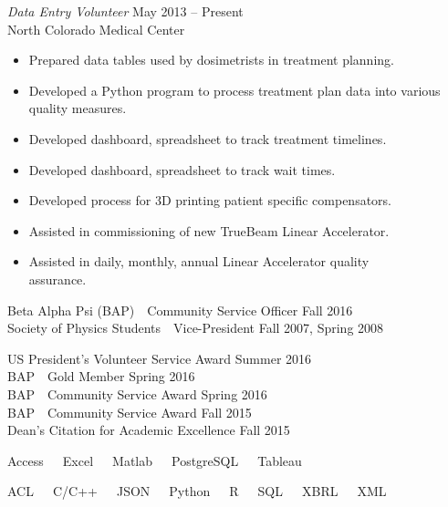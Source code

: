 \documentclass{article}
\begin{document}
\begin{description}[leftmargin=!,labelwidth=3cm]
{\sl Data Entry Volunteer} \hfill May 2013 -- Present\\North Colorado Medical Center
\begin{itemize}[rightmargin=4.3cm]
    \item Prepared data tables used by dosimetrists in treatment planning.
    \item Developed a Python program to process treatment plan data into various quality measures.
    \item Developed dashboard, spreadsheet to track treatment timelines.
    \item Developed dashboard, spreadsheet to track wait times.
    \item Developed process for 3D printing patient specific compensators.
    \item Assisted in commissioning of new TrueBeam Linear Accelerator.
    \item Assisted in daily, monthly, annual Linear Accelerator quality \\ assurance.
\end{itemize}

\item[Leadership]
Beta Alpha Psi (BAP)\ \ Community Service Officer \hfill Fall 2016\\
Society of Physics Students\ \ Vice-President \hfill Fall 2007, Spring 2008

\item[Awards]
US President's Volunteer Service Award \hfill Summer 2016\\
BAP\ \ Gold Member \hfill Spring 2016\\
BAP\ \ Community Service Award \hfill Spring 2016\\
BAP\ \ Community Service Award \hfill   Fall 2015\\
Dean's Citation for Academic Excellence \hfill Fall 2015

\item[Tools]
Access\ \ \ Excel\ \ \ Matlab\ \ \ PostgreSQL\ \ \ Tableau

\item[Languages]
ACL\ \ \ C/C++\ \ \ JSON\ \ \ Python\ \ \ R\ \ \ SQL\ \ \ XBRL\ \ \ XML\\\ \\



\end{description}
\end{document}
